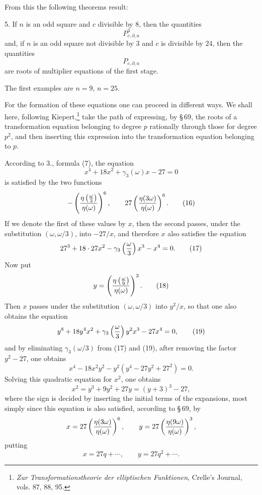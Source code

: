 \documentclass[11pt]{article}
\begin{document}
From this the following theorems result:

5. If $n$ is an odd square and $c$ divisible by $8$, then the quantities
\[
 P_{c,\partial,a}^{3}
\]
and, if $n$ is an odd square not divisible by $3$ and $c$ is divisible by $24$, then the quantities
\[
 P_{c,\partial,a}
\]
are roots of multiplier equations of the first stage.

The first examples are $n=9$, $n=25$.

For the formation of these equations one can proceed in different ways. We shall here, following Kiepert,\footnote{\emph{Zur Transformationstheorie der elliptischen Funktionen}, Crelle's Journal, vols. 87, 88, 95.} take the path of expressing, by \S\,69, the roots of a transformation equation belonging to degree $p$ rationally through those for degree $p^2$, and then inserting this expression into the transformation equation belonging to $p$.

According to 3., formula (7), the equation
\begin{equation}
 x^4+18x^2+\gamma_3(\omega)x-27=0
\tag{15}
\end{equation}
is satisfied by the two functions
\begin{equation}
 -\left({\eta\left({\omega\over3}\right)\over\eta(\omega)}\right)^6,
 \qquad
 27\left({\eta(3\omega)\over\eta(\omega)}\right)^6.
\tag{16}
\end{equation}
If we denote the first of these values by $x$, then the second passes, under the substitution $(\omega,\omega/3)$, into $-27/x$, and therefore $x$ also satisfies the equation
\begin{equation}
 27^3+18\cdot27x^2-\gamma_3\left({\omega\over3}\right)x^3-x^4=0.
\tag{17}
\end{equation}
Now put
\begin{equation}
 y=\left({\eta\left({\omega\over9}\right)\over\eta(\omega)}\right)^3.
\tag{18}
\end{equation}
Then $x$ passes under the substitution $(\omega,\omega/3)$ into $y^2/x$, so that one also obtains the equation
\begin{equation}
 y^8+18y^4x^2+\gamma_3\left({\omega\over3}\right)y^2x^3-27x^4=0,
\tag{19}
\end{equation}
and by eliminating $\gamma_3(\omega/3)$ from (17) and (19), after removing the factor $y^2-27$, one obtains
\begin{equation}
 x^4-18x^2y^2-y^2(y^4-27y^2+27^2)=0.
\tag{20}
\end{equation}
Solving this quadratic equation for $x^2$, one obtains
\begin{equation}
 x^2=y^3+9y^2+27y=(y+3)^3-27,
\tag{21}
\end{equation}
where the sign is decided by inserting the initial terms of the expansions, most simply since this equation is also satisfied, according to \S\,69, by
\[
 x=27\left({\eta(3\omega)\over\eta(\omega)}\right)^6,
 \qquad
 y=27\left({\eta(9\omega)\over\eta(\omega)}\right)^3,
\]
putting
\[
 x=27q+\cdots,
 \qquad
 y=27q^2+\cdots.
\]
\end{document}
